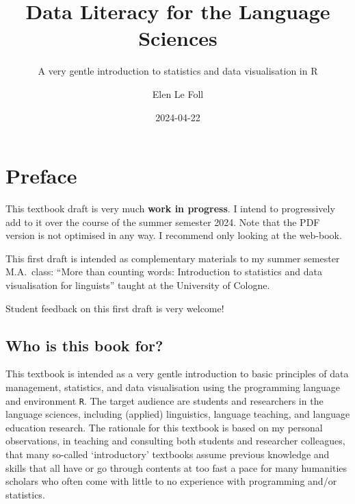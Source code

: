 \documentclass[
  letterpaper,
  DIV=11,
  numbers=noendperiod,
  oneside]{scrreprt}
\title{Data Literacy for the Language Sciences}
\subtitle{A very gentle introduction to statistics and data
visualisation in R}
\author{Elen Le Foll}
\date{2024-04-22}
\renewcommand*\contentsname{Table of contents}
\newcommand\contentsname{Table of contents}
\begin{document}
\maketitle

\renewcommand*\contentsname{Table of contents}
{
\hypersetup{linkcolor=}
\setcounter{tocdepth}{2}
\tableofcontents
}

\chapter*{Preface}\label{preface}


\begin{tcolorbox}[enhanced jigsaw, colframe=quarto-callout-warning-color-frame, breakable, opacityback=0, leftrule=.75mm, title=\textcolor{quarto-callout-warning-color}{\faExclamationTriangle}\hspace{0.5em}{Warning}, colbacktitle=quarto-callout-warning-color!10!white, toptitle=1mm, bottomrule=.15mm, rightrule=.15mm, coltitle=black, colback=white, bottomtitle=1mm, titlerule=0mm, opacitybacktitle=0.6, toprule=.15mm, arc=.35mm, left=2mm]

This textbook draft is very much \textbf{work in progress}. I intend to
progressively add to it over the course of the summer semester 2024.
Note that the PDF version is not optimised in any way. I recommend only
looking at the web-book.

This first draft is intended as complementary materials to my summer
semester M.A.~class: ``More than counting words: Introduction to
statistics and data visualisation for linguists'' taught at the
University of Cologne.

Student feedback on this first draft is very welcome!

\end{tcolorbox}

\section*{Who is this book for?}\label{who-is-this-book-for}


This textbook is intended as a very gentle introduction to basic
principles of data management, statistics, and data visualisation using
the programming language and environment \texttt{R}. The target audience
are students and researchers in the language sciences, including
(applied) linguistics, language teaching, and language education
research. The rationale for this textbook is based on my personal
observations, in teaching and consulting both students and researcher
colleagues, that many so-called `introductory' textbooks assume previous
knowledge and skills that all have or go through contents at too fast a
pace for many humanities scholars who often come with little to no
experience with programming and/or statistics.
\end{document}
